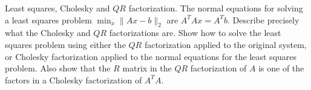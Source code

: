 \documentclass[14pt]{extarticle}
\begin{document}
\newpage
Least squares, Cholesky and $Q R$ factorization. The normal equations for solving a least squares problem $\min _{x}\|A x-b\|_{2}$ are $A^{T} A x=A^{T} b$. Describe precisely what the Cholesky and $Q R$ factorizations are. Show how to solve the least squares problem using either the $Q R$ factorization applied to the original system, or Cholesky factorization applied to the normal equations for the least squares problem. Also show that the $R$ matrix in the $Q R$ factorization of $A$ is one of the factors in a Cholesky factorization of $A^{T} A$.
\newpage
\end{document}

